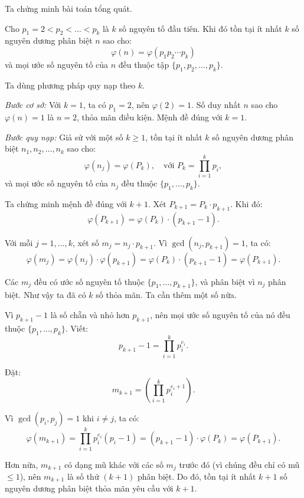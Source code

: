 \documentclass[../09-contruction-methods.tex]{subfiles}
\begin{document}
\begin{soln}
	Ta chứng minh bài toán tổng quát.
	\begin{claim*}
		Cho \( p_1 = 2 < p_2 < \dots < p_k \) là \( k \) số nguyên tố đầu tiên. Khi đó tồn tại ít nhất \( k \) số nguyên dương phân biệt \( n \) sao cho:
		\[
			\varphi(n) = \varphi(p_1p_2\cdots p_k)
		\]
		và mọi ước số nguyên tố của \( n \) đều thuộc tập \( \{p_1, p_2, \dots, p_k\} \).
	\end{claim*}
	\begin{subproof}
		Ta dùng phương pháp quy nạp theo \( k \).
	
		\textit{Bước cơ sở:} Với \( k = 1 \), ta có \( p_1 = 2 \), nên \( \varphi(2) = 1 \).  
		Số duy nhất \( n \) sao cho \( \varphi(n) = 1 \) là \( n = 2 \), thỏa mãn điều kiện. Mệnh đề đúng với \( k = 1 \).
		
		\textit{Bước quy nạp:} Giả sử với một số \( k \geq 1 \), tồn tại ít nhất \( k \) số nguyên dương phân biệt \( n_1, n_2, \dots, n_k \) sao cho:
		\[
			\varphi(n_j) = \varphi(P_k), \quad \text{với } P_k = \prod_{i=1}^k p_i,
		\]
		và mọi ước số nguyên tố của \( n_j \) đều thuộc \( \{p_1, \dots, p_k\} \).
		
		Ta chứng minh mệnh đề đúng với \( k + 1 \).
		Xét \( P_{k+1} = P_k \cdot p_{k+1} \). Khi đó:
		\[
			\varphi(P_{k+1}) = \varphi(P_k) \cdot (p_{k+1} - 1).
		\]
		
		Với mỗi \( j = 1, \dots, k \), xét số \( m_j = n_j \cdot p_{k+1} \).  
		Vì \( \gcd(n_j, p_{k+1}) = 1 \), ta có:
		\[
			\varphi(m_j) = \varphi(n_j) \cdot \varphi(p_{k+1}) = \varphi(P_k) \cdot (p_{k+1} - 1) = \varphi(P_{k+1}).
		\]
		
		Các \( m_j \) đều có ước số nguyên tố thuộc \( \{p_1, \dots, p_{k+1}\} \), và phân biệt vì \( n_j \) phân biệt.
		Như vậy ta đã có \( k \) số thỏa mãn. Ta cần thêm một số nữa.
		
		Vì \( p_{k+1} - 1 \) là số chẵn và nhỏ hơn \( p_{k+1} \), nên mọi ước số nguyên tố của nó đều thuộc \( \{p_1, \dots, p_k\} \).  
		Viết:
		\[
			p_{k+1} - 1 = \prod_{i=1}^k p_i^{e_i}.
		\]
		
		Đặt:
		\[
			m_{k+1} = \left( \prod_{i=1}^k p_i^{e_i + 1} \right).
		\]
		
		Vì \( \gcd(p_i, p_j) = 1 \) khi \( i \ne j \), ta có:
		\[
			\varphi(m_{k+1}) = \prod_{i=1}^k p_i^{e_i}(p_i - 1) = (p_{k+1} - 1) \cdot \varphi(P_k) = \varphi(P_{k+1}).
		\]
		
		Hơn nữa, \( m_{k+1} \) có dạng mũ khác với các số \( m_j \) trước đó (vì chúng đều chỉ có mũ \( \leq 1 \)), nên \( m_{k+1} \) là số thứ \( (k+1) \) phân biệt.
		Do đó, tồn tại ít nhất \( k+1 \) số nguyên dương phân biệt thỏa mãn yêu cầu với \( k+1 \).
	\end{subproof}
\end{soln}

\end{document}

